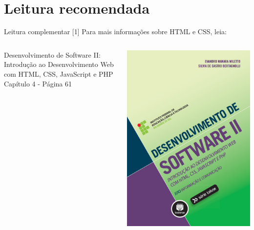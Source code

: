 \documentclass{beamer}
\begin{document}
\section{Leitura recomendada}
\begin{frame}{Leitura complementar [1]}
 Para mais informações sobre HTML e CSS, leia:\\
 \begin{columns}
   \begin{column}{0.5\textwidth}
    Desenvolvimento de Software II: Introdução ao Desenvolvimento Web com HTML, CSS, JavaScript e PHP \\
     Capítulo 4 - Página 61\\ 
      \cite{miletto2014desenvolvimento}
   \end{column}
   \begin{column}{0.3\textwidth}
    \begin{center}
  \includegraphics[height=0.45\paperheight]{milleto2014.jpeg} \\
 \end{center}
   \end{column}
 \end{columns}
\end{frame}
\end{document}
